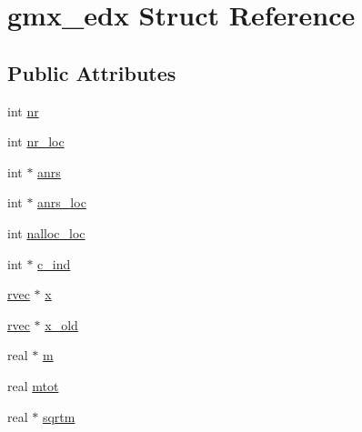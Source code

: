 \hypertarget{structgmx__edx}{\section{gmx\-\_\-edx \-Struct \-Reference}
\label{structgmx__edx}
}
\subsection*{\-Public \-Attributes}
\begin{DoxyCompactItemize}
\item 
int \hyperlink{structgmx__edx_abc3897fbe59e56cf815b6fe48a57d511}{nr}
\item 
int \hyperlink{structgmx__edx_a6a29f93a9eedc6ca6bdf9e3ec97f9ef4}{nr\-\_\-loc}
\item 
int $\ast$ \hyperlink{structgmx__edx_a8123a5a962388d22c0e0e756389c7cd5}{anrs}
\item 
int $\ast$ \hyperlink{structgmx__edx_afddeab964a2c237f27164c40da3c2f56}{anrs\-\_\-loc}
\item 
int \hyperlink{structgmx__edx_a8cced363379cca57baff252e5ba2cdf4}{nalloc\-\_\-loc}
\item 
int $\ast$ \hyperlink{structgmx__edx_a9844f702f1459cbe590b8fd29714741d}{c\-\_\-ind}
\item 
\hyperlink{share_2template_2gromacs_2types_2simple_8h_aa02a552a4abd2f180c282a083dc3a999}{rvec} $\ast$ \hyperlink{structgmx__edx_a7db9a3b1ee8482cdc0ece1db3699ec7c}{x}
\item 
\hyperlink{share_2template_2gromacs_2types_2simple_8h_aa02a552a4abd2f180c282a083dc3a999}{rvec} $\ast$ \hyperlink{structgmx__edx_aad198cc809f55ae2e8a3735a9ad6a59f}{x\-\_\-old}
\item 
real $\ast$ \hyperlink{structgmx__edx_a40eb4b65f28f529da78aad9929ef1976}{m}
\item 
real \hyperlink{structgmx__edx_ae0d3be10c27c2f924123c4701f3181ae}{mtot}
\item 
real $\ast$ \hyperlink{structgmx__edx_ae55ad4c2c4527dd18ab12d05ddd9d37a}{sqrtm}
\end{DoxyCompactItemize}


